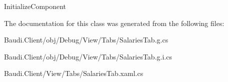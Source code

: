 Initialize\+Component 



The documentation for this class was generated from the following files\+:\begin{DoxyCompactItemize}
\item 
Baudi.\+Client/obj/\+Debug/\+View/\+Tabs/Salaries\+Tab.\+g.\+cs\item 
Baudi.\+Client/obj/\+Debug/\+View/\+Tabs/Salaries\+Tab.\+g.\+i.\+cs\item 
Baudi.\+Client/\+View/\+Tabs/Salaries\+Tab.\+xaml.\+cs\end{DoxyCompactItemize}
